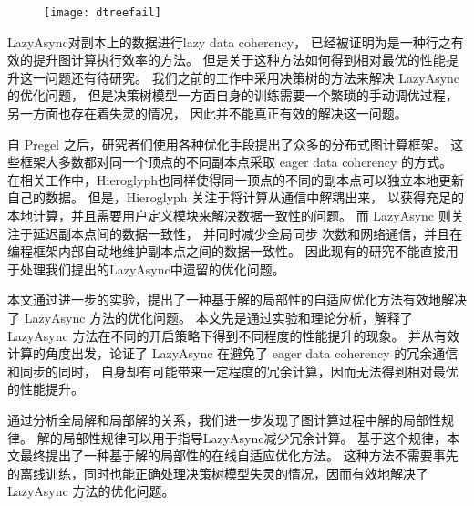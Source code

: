 \begin{figure}[!htbp]
\centering
\texttt{[image: dtreefail]}
\label{fig:dtfail}
\end{figure}

LazyAsync对副本上的数据进行lazy data coherency，
已经被证明为是一种行之有效的提升图计算执行效率的方法。
但是关于这种方法如何得到相对最优的性能提升这一问题还有待研究。
我们之前的工作中采用决策树的方法来解决 LazyAsync 的优化问题，
但是决策树模型一方面自身的训练需要一个繁琐的手动调优过程，另一方面也存在着失灵的情况，
因此并不能真正有效的解决这一问题。


自 Pregel 之后，研究者们使用各种优化手段提出了众多的分布式图计算框架。
这些框架大多数都对同一个顶点的不同副本点采取 eager data coherency 的方式。
在相关工作中，Hieroglyph\cite{ju2017hieroglyph}也同样使得同一顶点的不同的副本点可以独立本地更新自己的数据。
但是，Hieroglyph 关注于将计算从通信中解耦出来， 以获得充足的本地计算，并且需要用户定义模块来解决数据一致性的问题。
而 LazyAsync 则关注于延迟副本点间的数据一致性， 并同时减少全局同步 次数和网络通信，并且在编程框架内部自动地维护副本点之间的数据一致性。 
因此现有的研究不能直接用于处理我们提出的LazyAsync中遗留的优化问题。


本文通过进一步的实验，提出了一种基于解的局部性的自适应优化方法有效地解决了 LazyAsync 方法的优化问题。
本文先是通过实验和理论分析，解释了LazyAsync 方法在不同的开启策略下得到不同程度的性能提升的现象。
并从有效计算的角度出发，论证了 LazyAsync 在避免了 eager data coherency 的冗余通信和同步的同时，
自身却有可能带来一定程度的冗余计算，因而无法得到相对最优的性能提升。

通过分析全局解和局部解的关系，我们进一步发现了图计算过程中解的局部性规律。
解的局部性规律可以用于指导LazyAsync减少冗余计算。
基于这个规律，本文最终提出了一种基于解的局部性的在线自适应优化方法。
这种方法不需要事先的离线训练，同时也能正确处理决策树模型失灵的情况，因而有效地解决了
LazyAsync 方法的优化问题。
